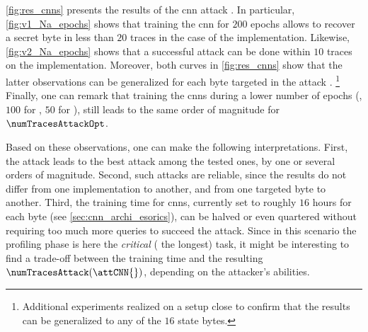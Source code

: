 \autoref{fig:res_cnns} presents the results of the \gls{cnn} attack \attCNN{}.
In particular, \autoref{fig:v1_Na_epochs} shows that training the \gls{cnn} for \(200\) epochs allows to recover a secret byte in less than \(20\) traces in the case of the \mbedTLS{} implementation.
Likewise, \autoref{fig:v2_Na_epochs} shows that a successful attack can be done within \(10\) traces on the \aeshuitbit{} implementation.
Moreover, both curves in \autoref{fig:res_cnns} show that the latter observations can be generalized for each byte targeted in the attack \attCNN{}.%
\footnote{
	Additional experiments realized on a setup close to \attCNN{} confirm that the results can be generalized to any of the \(16\) state bytes.
}
Finally, one can remark that training the \glspl{cnn} during a lower number of epochs
(\eg{}, \(100\) for \mbedTLS{}, \(50\) for \aeshuitbit{}), still leads to the same
order of magnitude for \(\numTracesAttackOpt\).

Based on these observations, one can make the following interpretations.
First, the attack \attCNN{} leads to the best attack among the tested ones, by one or several orders of magnitude.
Second, such attacks are reliable, since the results do not differ from one implementation to another, and from one targeted byte to another.
Third, the training time for \glspl{cnn}, currently set to roughly \(16\) hours for each byte (see \autoref{sec:cnn_archi_esorics}), can be halved or even quartered without requiring too much more queries to succeed the attack.
Since in this scenario the profiling phase is here the \textit{critical} (\ie{} the longest) task, it might be interesting to find a trade-off between the training time and the resulting \(\numTracesAttack(\attCNN{})\), depending on the attacker's abilities.

